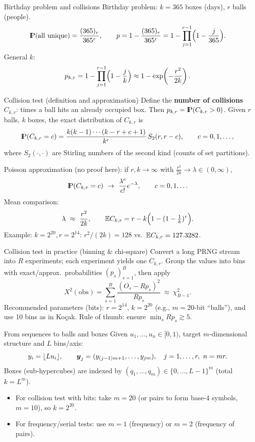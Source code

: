 \documentclass[aspectratio=169]{beamer}
\newcommand{\Prob}{{\rm I\hspace{-0.8mm}P}}
\begin{document}

\begin{frame}{Birthday problem and collisions}
Birthday problem: \(k=365\) boxes (days), \(r\) balls (people).
\[
\Prob(\text{all unique})=\frac{(365)_r}{365^r},\qquad
p=1-\frac{(365)_r}{365^r}=1-\prod_{j=1}^{r-1}\Bigl(1-\frac{j}{365}\Bigr).
\]
General \(k\):
\[
p_{k,r}=1-\prod_{j=1}^{r-1}\Bigl(1-\frac{j}{k}\Bigr)\approx 1-\exp\!\left(-\frac{r^2}{2k}\right).
\]


\end{frame}


\begin{frame}{Collision test (definition and approximation)}
Define the \textbf{number of collisions} \(C_{k,r}\): times a ball hits an already occupied box.
Then \(p_{k,r}=\Prob(C_{k,r}>0)\).
Given \(r\) balls, \(k\) boxes, the exact distribution of \(C_{k,r}\) is
\[
\Prob(C_{k,r}=c)=\frac{k(k-1)\cdots(k-r+c+1)}{k^r}\,S_2(r,r-c),\qquad c=0,1,\ldots,
\]
where \(S_2(\cdot,\cdot)\) are Stirling numbers of the second kind (counts of set partitions).

\medskip
\pause
Poisson approximation (no proof here): if \(r,k\to\infty\) with \(\tfrac{r^2}{2k}\to\lambda\in(0,\infty)\),
\[
\Prob(C_{k,r}=c)\ \to\ \frac{\lambda^c}{c!}e^{-\lambda},\qquad c=0,1,\ldots
\]
Mean comparison:
\[
\lambda\ \approx\ \frac{r^2}{2k},\qquad
\Exp C_{k,r}=r-k\Bigl(1-(1-\tfrac1k)^r\Bigr).
\]
Example: \(k=2^{20}, r=2^{14}\): \(r^2/(2k)=128\) vs.\ \(\mathbb{E} C_{k,r}=127.3282\).
\end{frame}


\begin{frame}{Collision test in practice (binning \& chi-square)}
Convert a long PRNG stream into \(R\) experiments; each experiment yields one \(C_{k,r}\).
Group the values into bins with exact/approx.\ probabilities \((p_s)_{s=1}^B\), then apply
\[
X^2(\text{obs})=\sum_{s=1}^B \frac{(O_s-Rp_s)^2}{Rp_s}\ \approx\ \chi^2_{B-1}.
\]
\pause
Recommended parameters (bits): \(r=2^{14}\), \(k=2^{20}\) (e.g., \(m=20\)-bit “balls”), and use 10 bins as in Koçak.
Rule of thumb: ensure \(\min_s Rp_s\gtrsim 5\).
\end{frame}


\begin{frame}{From sequences to balls and boxes}
Given \(u_1,\ldots,u_n\in[0,1)\), target \(m\)-dimensional structure and \(L\) bins/axis:
\[
y_i=\lfloor L u_i\rfloor,\qquad
\mbox{\boldmath$y$}_j=(y_{(j-1)m+1},\ldots,y_{jm}),\quad j=1,\ldots,r,\ n=mr.
\]
Boxes (sub-hypercubes) are indexed by \( (q_1,\ldots,q_m)\in\{0,\ldots,L-1\}^m\) (total \(k=L^m\)).
\begin{itemize}
  \item For collision test with bits: take \(m=20\) (or pairs to form base-4 symbols, \(m=10\)), so \(k=2^{20}\).
  \item For frequency/serial tests: use \(m=1\) (frequency) or \(m=2\) (frequency of pairs).
\end{itemize}
\end{frame}
\end{document}
